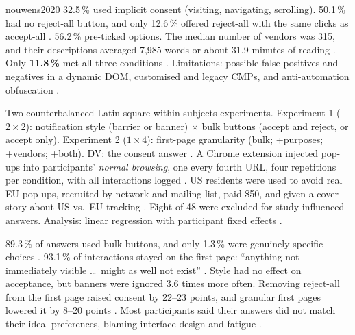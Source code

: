 \begin{papercard}{nouwens2020}
 32.5\,\% used implicit consent (visiting, navigating, scrolling). 50.1\,\% had no reject-all button, and only 12.6\,\% offered reject-all with the same clicks as accept-all . 56.2\,\% pre-ticked options. The median number of vendors was 315, and their descriptions averaged 7,985 words or about 31.9 minutes of reading . Only \textbf{11.8\,\%} met all three conditions . Limitations: possible false positives and negatives in a dynamic DOM, customised and legacy CMPs, and anti-automation obfuscation .

 Two counterbalanced Latin-square within-subjects experiments. Experiment 1 ($2\times2$): notification style (barrier or banner) $\times$ bulk buttons (accept and reject, or accept only). Experiment 2 ($1\times4$): first-page granularity (bulk; +purposes; +vendors; +both). DV: the consent answer . A Chrome extension injected pop-ups into participants' \emph{normal browsing}, one every fourth URL, four repetitions per condition, with all interactions logged . US residents were used to avoid real EU pop-ups, recruited by network and mailing list, paid \$50, and given a cover story about US vs.\ EU tracking . Eight of 48 were excluded for study-influenced answers. Analysis: linear regression with participant fixed effects .

 89.3\,\% of answers used bulk buttons, and only 1.3\,\% were genuinely specific choices . 93.1\,\% of interactions stayed on the first page: ``anything not immediately visible \ldots\ might as well not exist'' . Style had no effect on acceptance, but banners were ignored 3.6 times more often. Removing reject-all from the first page raised consent by 22--23 points, and granular first pages lowered it by 8--20 points . Most participants said their answers did not match their ideal preferences, blaming interface design and fatigue .


\end{papercard}
